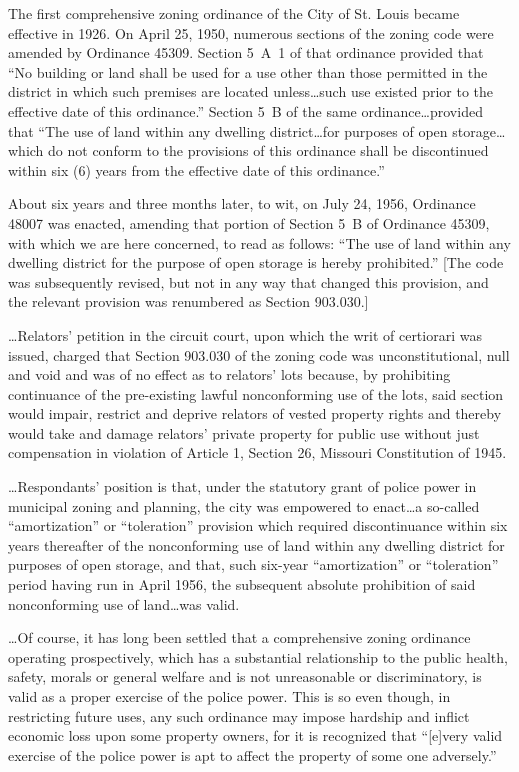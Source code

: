 The first comprehensive zoning ordinance of the City of St. Louis became
effective in 1926. On April 25, 1950, numerous sections of the zoning code were
amended by Ordinance 45309. Section 5~A~1 of that ordinance provided that ``No
building or land shall be used for a use other than those permitted in the
district in which such premises are located unless\ldots such use existed prior
to the effective date of this ordinance.'' Section 5~B of the same
ordinance\ldots provided that ``The use of land within any dwelling
district\ldots for purposes of open storage\ldots which do not conform to the
provisions of this ordinance shall be discontinued within six (6) years from the
effective date of this ordinance.''

About six years and three months later, to wit, on July 24, 1956, Ordinance
48007 was enacted, amending that portion of Section 5~B of Ordinance 45309, with
which we are here concerned, to read as follows: ``The use of land within any
dwelling district for the purpose of open storage is hereby prohibited.'' [The
code was subsequently revised, but not in any way that changed this provision,
and the relevant provision was renumbered as Section 903.030.]

\ldots Relators' petition in the circuit court, upon which the writ of
certiorari was issued, charged that Section 903.030 of the zoning code was
unconstitutional, null and void and was of no effect as to relators' lots
because, by prohibiting continuance of the pre-existing lawful nonconforming use
of the lots, said section would impair, restrict and deprive relators of vested
property rights and thereby would take and damage relators' private property for
public use without just compensation in violation of Article 1, Section 26,
Missouri Constitution of 1945. 

\ldots Respondants' position is that, under the statutory grant of police power
in municipal zoning and planning, the city was empowered to enact\ldots a
so-called ``amortization'' or ``toleration'' provision which required
discontinuance within six years thereafter of the nonconforming use of land
within any dwelling district for purposes of open storage, and that, such
six-year ``amortization'' or ``toleration'' period having run in April 1956, the
subsequent absolute prohibition of said nonconforming use of land\ldots was
valid.

\ldots Of course, it has long been settled that a comprehensive zoning ordinance
operating prospectively, which has a substantial relationship to the public
health, safety, morals or general welfare and is not unreasonable or
discriminatory, is valid as a proper exercise of the police power. This is so
even though, in restricting future uses, any such ordinance may impose hardship
and inflict economic loss upon some property owners, for it is recognized that
``[e]very valid exercise of the police power is apt to affect the property of
some one adversely.''

